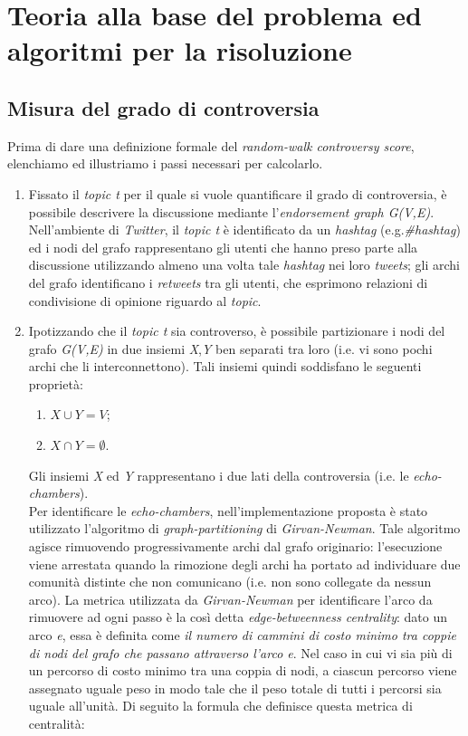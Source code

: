 \chapter{Teoria alla base del problema ed algoritmi per la risoluzione}
\label{chap:teoria}
\section{Misura del grado di controversia}
Prima di dare una definizione formale del \textit{random-walk controversy score}, elenchiamo ed illustriamo i passi necessari per calcolarlo.
\begin{enumerate}
\item Fissato il \textit{topic t} per il quale si vuole quantificare il grado di controversia, è possibile descrivere la discussione mediante l'\textit{endorsement graph G(V,E)}. Nell'ambiente di \textit{Twitter}, il \textit{topic t} è identificato da un \textit{hashtag} (e.g.\textit{\#hashtag}) ed i nodi del grafo rappresentano gli utenti che hanno preso parte alla discussione utilizzando almeno una volta tale \textit{hashtag} nei loro \textit{tweets}; gli archi del grafo identificano i \textit{retweets} tra gli utenti, che esprimono relazioni di condivisione di opinione riguardo al \textit{topic}.
\item Ipotizzando che il \textit{topic t} sia controverso, è possibile partizionare i nodi del grafo \textit{G(V,E)} in due insiemi \textit{X},\textit{Y} ben separati tra loro (i.e. vi sono pochi archi che li interconnettono). Tali insiemi quindi soddisfano le seguenti proprietà:
\begin{enumerate}
\item $\textit{X}\cup\textit{Y} = \textit{V}$;
\item $\textit{X}\cap\textit{Y} = \emptyset$.
\end{enumerate}
Gli insiemi \textit{X} ed \textit{Y} rappresentano i due lati della controversia (i.e. le \textit{echo-chambers}).
\\Per identificare le \textit{echo-chambers}, nell'implementazione proposta è stato utilizzato l'algoritmo di \textit{graph-partitioning} di \textit{Girvan-Newman}\cite{girvan:paper}. Tale algoritmo agisce rimuovendo progressivamente archi dal grafo originario: l'esecuzione viene arrestata quando la rimozione degli archi ha portato ad individuare due comunità distinte che non comunicano (i.e. non sono collegate da nessun arco). La metrica utilizzata da \textit{Girvan-Newman} per identificare l'arco da rimuovere ad ogni passo è la così detta \textit{edge-betweenness centrality}: dato un arco \textit{e}, essa è definita come \textit{il numero di cammini di costo minimo tra coppie di nodi del grafo che passano attraverso l'arco e}. Nel caso in cui vi sia più di un percorso di costo minimo tra una coppia di nodi, a ciascun percorso viene assegnato uguale peso in modo tale che il peso totale di tutti i percorsi sia uguale all'unità. Di seguito la formula che definisce questa metrica di centralità:

\end{enumerate}
